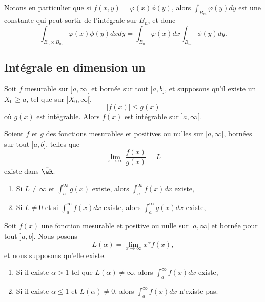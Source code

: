 Notons en particulier que si $f(x,y)=\varphi(x)\phi(y)$, alors $\int_{B_m}\varphi(y)dy$ est une constante qui peut sortir de l'intégrale sur $B_n$, et donc
\begin{equation}		\label{EqFubiniFactori}
	\int_{B_n\times B_m}\varphi(x)\phi(y)dxdy=\int_{B_n}\varphi(x)dx\int_{B_m}\phi(y)dy.
\end{equation}

					\subsection{Intégrale en dimension un}

\begin{proposition}
Soit $f$ mesurable sur $]a,\infty[$ et bornée sur tout $]a,b]$, et supposons qu'il existe un $X_0\geq a$, tel que sur $]X_0,\infty[$,
\begin{equation}
	| f(x) |\leq g(x)
\end{equation}
où $g(x)$ est intégrable. Alors $f(x)$ est intégrable sur $]a,\infty[$.
\end{proposition}

\begin{corollary}
Soient $f$ et $g$ des fonctions mesurables et positives ou nulles sur $]a,\infty[$, bornées sur tout $]a,b]$, telles que 
\begin{equation}
	\lim_{x\to\infty}\frac{ f(x) }{ g(x) }=L
\end{equation}
existe dans $\bar\eR$.
\begin{enumerate}
\item Si $L\neq\infty$ et $\int_{a}^{\infty}g(x)$ existe, alors $\int_a^{\infty}f(x)dx$ existe,
\item Si $L\neq 0$ et si $\int_a^{\infty}f(x)dx$ existe, alors $\int_a^{\infty}g(x)dx$ existe,
\end{enumerate}
\end{corollary}

\begin{corollary}			\label{CorCritFonsTest}
Soit $f(x)$ une fonction mesurable et positive ou nulle sur $]a,\infty[$ et bornée pour tout $]a,b]$. Nous posons
\begin{equation}
	L(\alpha)=\lim_{x\to\infty}x^{\alpha}f(x),
\end{equation}
et nous supposons qu'elle existe.
\begin{enumerate}
\item Si il existe $\alpha>1$ tel que $L(\alpha)\neq\infty$, alors $\int_a^{\infty}f(x)dx$ existe,
\item Si il existe $\alpha\leq1$ et $L(\alpha)\neq 0$, alors $\int_a^{\infty}f(x)dx$ n'existe pas.
\end{enumerate}
\end{corollary}

